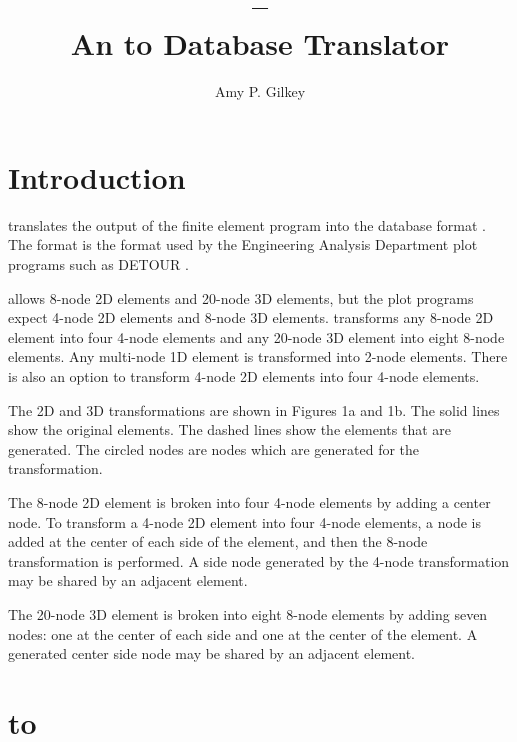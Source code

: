 

%

\newcommand{\PROGRAM}{POSABA}
%
\author{Amy P. Gilkey}
\title{\caps{\PROGRAM} -- \\
An  to  Database Translator}
\maketitle

\chapter{Introduction} \label{chap:intro}

\caps{\PROGRAM} translates the output of the finite element program
 \cite{bib:abaqus} into the  database format
\cite{bib:seaco}. The  format is the format used by the
Engineering Analysis Department plot programs such as DETOUR
\cite{bib:detour}.

 allows 8-node 2D elements and 20-node 3D elements, but the
plot programs expect 4-node 2D elements and 8-node 3D elements.
\caps{\PROGRAM} transforms any 8-node 2D element into four 4-node
elements and any 20-node 3D element into eight 8-node elements. Any
multi-node 1D element is transformed into 2-node elements. There is also
an option to transform 4-node 2D elements into four 4-node elements.

The 2D and 3D transformations are shown in Figures 1a and 1b. The solid
lines show the original elements. The dashed lines show the elements
that are generated. The circled nodes are nodes which are generated for
the transformation.

The 8-node 2D element is broken into four 4-node elements by adding a
center node. To transform a 4-node 2D element into four 4-node elements,
a node is added at the center of each side of the element, and then the
8-node transformation is performed. A side node generated by the 4-node
transformation may be shared by an adjacent element.

The 20-node 3D element is broken into eight 8-node elements by adding
seven nodes: one at the center of each side and one at the center of the
element. A generated center side node may be shared by an adjacent
element.

\newpage \addtocounter{page}{1}

\chapter{ to } \label{chap:abasea}

